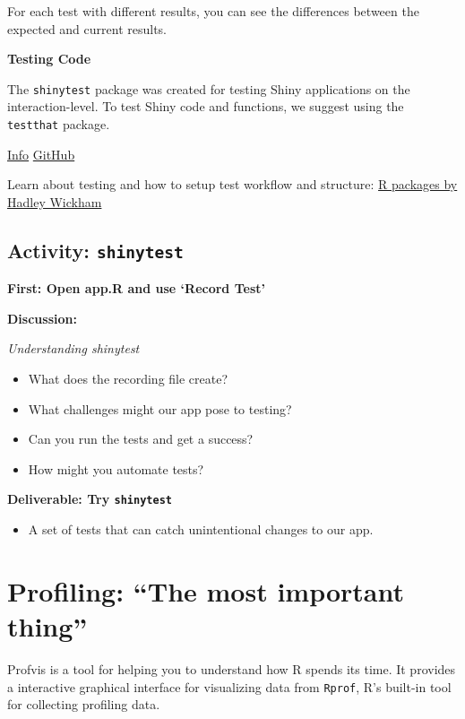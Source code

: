 \documentclass[]{book}
\providecommand{\tightlist}{%
  \setlength{\itemsep}{0pt}\setlength{\parskip}{0pt}}
\theoremstyle{definition}
\theoremstyle{definition}
\theoremstyle{definition}
\theoremstyle{remark}
\begin{document}
For each test with different results, you can see the differences
between the expected and current results.

\textbf{Testing Code}

The \texttt{shinytest} package was created for testing Shiny
applications on the interaction-level. To test Shiny code and functions,
we suggest using the \texttt{testthat} package.

\href{http://testthat.r-lib.org/}{Info}
\href{https://github.com/r-lib/testthat}{GitHub}

Learn about testing and how to setup test workflow and structure:
\href{http://r-pkgs.had.co.nz/tests.html}{R packages by Hadley Wickham}

\hypertarget{activity-shinytest}{%
\section{\texorpdfstring{Activity:
\texttt{shinytest}}{Activity: shinytest}}\label{activity-shinytest}}

\textbf{First: Open app.R and use `Record Test'}

\textbf{Discussion:}

\emph{Understanding shinytest}

\begin{itemize}
\tightlist
\item
  What does the recording file create?
\item
  What challenges might our app pose to testing?
\item
  Can you run the tests and get a success?
\item
  How might you automate tests?
\end{itemize}

\textbf{Deliverable: Try \texttt{shinytest}}

\begin{itemize}
\tightlist
\item
  A set of tests that can catch unintentional changes to our app.
\end{itemize}

\hypertarget{profiling-the-most-important-thing}{%
\chapter{Profiling: ``The most important
thing''}\label{profiling-the-most-important-thing}}

Profvis is a tool for helping you to understand how R spends its time.
It provides a interactive graphical interface for visualizing data from
\texttt{Rprof}, R's built-in tool for collecting profiling data.
\end{document}
